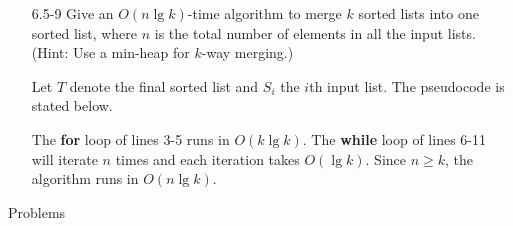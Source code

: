 \begin{enumerate}
\item[6.5{-}9]{Give an $O(n \lg k)$-time algorithm to merge $k$ sorted lists
into one sorted list, where $n$ is the total number of elements in all the input
lists. (Hint: Use a min-heap for $k$-way merging.)}

\begin{framed}
Let $T$ denote the final sorted list and $S_i$ the $i$th input list. The
pseudocode is stated below.

\begin{algorithm}[H]
\SetAlgoNoEnd\DontPrintSemicolon
\BlankLine
{}
\end{algorithm}

The \textbf{for} loop of lines 3{-}5 runs in $O(k \lg k)$. The \textbf{while}
loop of lines 6{-}11 will iterate $n$ times and each iteration takes $O(\lg k)$.
Since $n \ge k$, the algorithm runs in $O(n \lg k)$.
\end{framed}

\end{enumerate}

\newpage

{\large Problems}

